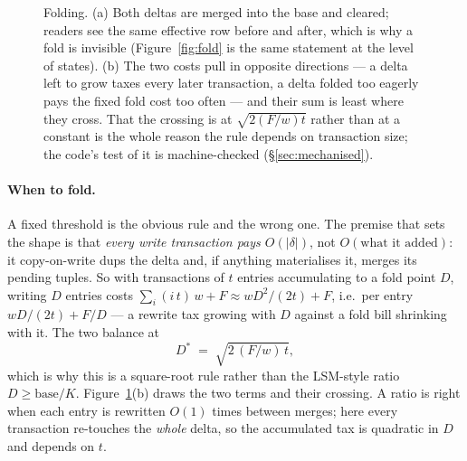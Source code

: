 \documentclass[11pt,a4paper]{article}
\theoremstyle{plain}
\theoremstyle{definition}
\theoremstyle{remark}
\begin{document}
\begin{figure}[t]
\caption{Folding. (a) Both deltas are merged into the base and cleared; readers
see the same effective row before and after, which is why a fold is invisible
(Figure~\ref{fig:fold} is the same statement at the level of states). (b) The
two costs pull in opposite directions --- a delta left to grow taxes every later
transaction, a delta folded too eagerly pays the fixed fold cost too often ---
and their sum is least where they cross. That the crossing is at
$\sqrt{2(F/w)t}$ rather than at a constant is the whole reason the rule depends
on transaction size; the code's test of it is machine-checked
(\S\ref{sec:mechanised}).}
\label{fig:foldcost}
\end{figure}

\paragraph{When to fold.} A fixed threshold is the obvious rule and the wrong
one. The premise that sets the shape is that \emph{every write transaction
pays $O(|\delta|)$}, not $O(\text{what it added})$: it copy-on-write dups the
delta and, if anything materialises it, merges its pending tuples. So with
transactions of $t$ entries accumulating to a fold point $D$, writing $D$
entries costs $\sum_i (i\,t)\,w + F \approx wD^2/(2t) + F$, i.e.\ per entry
$wD/(2t) + F/D$ --- a rewrite tax growing with $D$ against a fold bill
shrinking with it. The two balance at
\[
  D^{\ast} \;=\; \sqrt{2\,(F/w)\,t} ,
\]
which is why this is a square-root rule rather than the LSM-style ratio
$D \ge \text{base}/K$. Figure~\ref{fig:foldcost}(b) draws the two terms and
their crossing. A ratio is right when each entry is rewritten $O(1)$
times between merges; here every transaction re-touches the \emph{whole}
delta, so the accumulated tax is quadratic in $D$ and depends on $t$.
\end{document}
